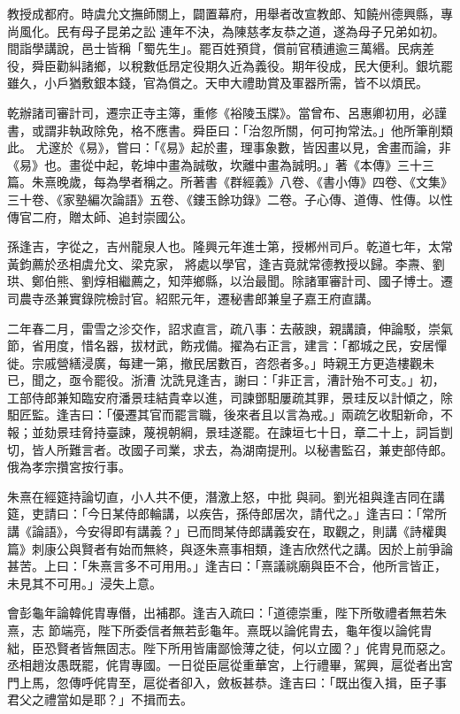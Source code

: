\begin{pinyinscope}
 教授成都府。時虞允文撫師關上，闢置幕府，用舉者改宣教郎、知饒州德興縣，專尚風化。民有母子昆弟之訟
 連年不決，為陳慈孝友恭之道，遂為母子兄弟如初。間詣學講說，邑士皆稱「蜀先生」。罷百姓預貸，償前官積逋逾三萬緡。民病差役，舜臣勸糾諸鄉，以稅數低昂定役期久近為義役。期年役成，民大便利。銀坑罷雖久，小戶猶敷銀本錢，官為償之。天申大禮助賞及軍器所需，皆不以煩民。



 乾辦諸司審計司，遷宗正寺主簿，重修《裕陵玉牒》。當曾布、呂惠卿初用，必謹書，或謂非執政除免，格不應書。舜臣曰：「治忽所關，何可拘常法。」他所筆削類此。
 尤邃於《易》，嘗曰：「《易》起於畫，理事象數，皆因畫以見，舍畫而論，非《易》也。畫從中起，乾坤中畫為誠敬，坎離中畫為誠明。」著《本傳》三十三篇。朱熹晚歲，每為學者稱之。所著書《群經義》八卷、《書小傳》四卷、《文集》三十卷、《家塾編次論語》五卷、《鏤玉餘功錄》二卷。子心傳、道傳、性傳。以性傳官二府，贈太師、追封崇國公。



 孫逢吉，字從之，吉州龍泉人也。隆興元年進士第，授郴州司戶。乾道七年，太常黃鈞薦於丞相虞允文、梁克家，
 將處以學官，逢吉竟就常德教授以歸。李燾、劉珙、鄭伯熊、劉焞相繼薦之，知萍鄉縣，以治最聞。除諸軍審計司、國子博士。遷司農寺丞兼實錄院檢討官。紹熙元年，遷秘書郎兼皇子嘉王府直講。



 二年春二月，雷雪之沴交作，詔求直言，疏八事：去蔽諛，親講讀，伸論駁，崇氣節，省用度，惜名器，拔材武，飭戎備。擢為右正言，建言：「都城之民，安居憚徙。宗戚營繕浸廣，每建一第，撤民居數百，咨怨者多。」時親王方更造樓觀未已，聞之，亟令罷役。浙漕
 沈詵見逢吉，謝曰：「非正言，漕計殆不可支。」初，工部侍郎兼知臨安府潘景珪結貴幸以進，司諫鄧馹屢疏其罪，景珪反以計傾之，除馹匠監。逢吉曰：「優遷其官而罷言職，後來者且以言為戒。」兩疏乞收馹新命，不報；並劾景珪脅持臺諫，蔑視朝綱，景珪遂罷。在諫垣七十日，章二十上，詞旨剴切，皆人所難言者。改國子司業，求去，為湖南提刑。以秘書監召，兼吏部侍郎。俄為孝宗攢宮按行事。



 朱熹在經筵持論切直，小人共不便，潛激上怒，中批
 與祠。劉光祖與逢吉同在講筵，吏請曰：「今日某侍郎輪講，以疾告，孫侍郎居次，請代之。」逢吉曰：「常所講《論語》，今安得即有講義？」已而問某侍郎講義安在，取觀之，則講《詩權輿篇》刺康公與賢者有始而無終，與逐朱熹事相類，逢吉欣然代之講。因於上前爭論甚苦。上曰：「朱熹言多不可用用。」逢吉曰：「熹議祧廟與臣不合，他所言皆正，未見其不可用。」浸失上意。



 會彭龜年論韓侂胄專僭，出補郡。逢吉入疏曰：「道德崇重，陛下所敬禮者無若朱熹，志
 節端亮，陛下所委信者無若彭龜年。熹既以論侂胄去，龜年復以論侂胄絀，臣恐賢者皆無固志。陛下所用皆庸鄙憸薄之徒，何以立國？」侂胄見而惡之。丞相趙汝愚既罷，侂胄專國。一日從臣扈從重華宮，上行禮畢，駕興，扈從者出宮門上馬，忽傳呼侂胄至，扈從者卻入，斂板甚恭。逢吉曰：「既出復入揖，臣子事君父之禮當如是耶？」不揖而去。




\end{pinyinscope}
